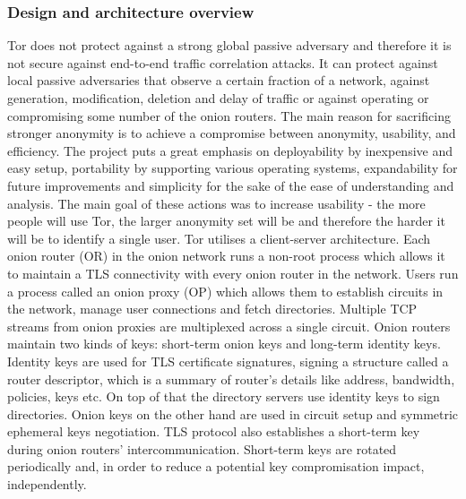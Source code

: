 \subsubsection{Design and architecture overview}
Tor does not protect against a strong global passive adversary and therefore it is not secure against end-to-end traffic correlation attacks. It can protect against local passive adversaries that observe a certain fraction of a network, against generation, modification, deletion and delay of traffic or against operating or compromising some number of the onion routers. The main reason for sacrificing stronger anonymity is to achieve a compromise between anonymity, usability, and efficiency.
The project puts a great emphasis on deployability by inexpensive and easy setup, portability by supporting various operating systems, expandability for future improvements and simplicity for the sake of the ease of understanding and analysis. The main goal of these actions was to increase usability - the more people will use Tor, the larger anonymity set will be and therefore the harder it will be to identify a single user.
Tor utilises a client-server architecture. Each onion router (OR) in the onion network runs a non-root process which allows it to maintain a TLS connectivity with every onion router in the network. Users run a process called an onion proxy (OP) which allows them to establish circuits in the network, manage user connections and fetch directories. Multiple TCP streams from onion proxies are multiplexed across a single circuit. Onion routers maintain two kinds of keys: short-term onion keys and long-term identity keys. Identity keys are used for TLS certificate signatures, signing a structure called a router descriptor, which is a summary of router’s details like address, bandwidth, policies, keys etc. On top of that the directory servers use identity keys to sign directories. Onion keys on the other hand are used in circuit setup and symmetric ephemeral keys negotiation. TLS protocol also establishes a short-term key during onion routers’ intercommunication. Short-term keys are rotated periodically and, in order to reduce a potential key compromisation impact, independently. 
